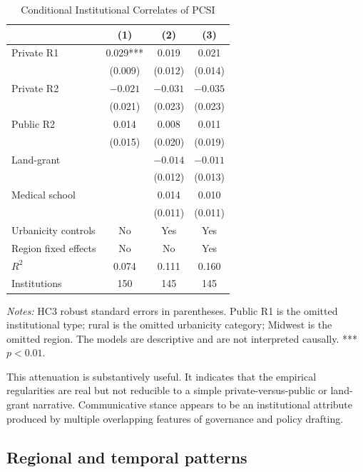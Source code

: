 \documentclass[12pt]{article}
\begin{document}
\begin{table}[H]
\centering
\caption{Conditional Institutional Correlates of PCSI}
\label{tab:conditional}
\begin{threeparttable}
\small
\begin{tabular}{lccc}
\toprule
 & (1) & (2) & (3)\\
\midrule
Private R1 & 0.029*** & 0.019 & 0.021\\
 & (0.009) & (0.012) & (0.014)\\
Private R2 & $-0.021$ & $-0.031$ & $-0.035$\\
 & (0.021) & (0.023) & (0.023)\\
Public R2 & 0.014 & 0.008 & 0.011\\
 & (0.015) & (0.020) & (0.019)\\
Land-grant &  & $-0.014$ & $-0.011$\\
 &  & (0.012) & (0.013)\\
Medical school &  & 0.014 & 0.010\\
 &  & (0.011) & (0.011)\\
Urbanicity controls & No & Yes & Yes\\
Region fixed effects & No & No & Yes\\
\midrule
$R^2$ & 0.074 & 0.111 & 0.160\\
Institutions & 150 & 145 & 145\\
\bottomrule
\end{tabular}
\begin{tablenotes}\footnotesize
\item \textit{Notes:} HC3 robust standard errors in parentheses. Public R1 is the omitted institutional type; rural is the omitted urbanicity category; Midwest is the omitted region. The models are descriptive and are not interpreted causally. *** $p<0.01$.
\end{tablenotes}
\end{threeparttable}
\end{table}

This attenuation is substantively useful. It indicates that the empirical regularities are real but not reducible to a simple private-versus-public or land-grant narrative. Communicative stance appears to be an institutional attribute produced by multiple overlapping features of governance and policy drafting.

\subsection{Regional and temporal patterns}
\end{document}

